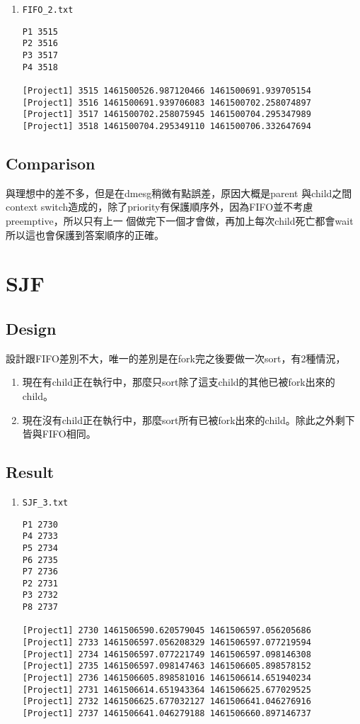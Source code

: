 \documentclass{article}
\begin{document}
\begin{CJK}{UTF8}{bkai}
\begin{enumerate}
\item \texttt{FIFO\_2.txt}
\begin{verbatim}
P1 3515
P2 3516
P3 3517
P4 3518

[Project1] 3515 1461500526.987120466 1461500691.939705154
[Project1] 3516 1461500691.939706083 1461500702.258074897
[Project1] 3517 1461500702.258075945 1461500704.295347989
[Project1] 3518 1461500704.295349110 1461500706.332647694
\end{verbatim}
\end{enumerate}

\subsection{Comparison}
與理想中的差不多，但是在dmesg稍微有點誤差，原因大概是parent 與child之間context
switch造成的，除了priority有保護順序外，因為FIFO並不考慮preemptive，所以只有上一
個做完下一個才會做，再加上每次child死亡都會wait所以這也會保護到答案順序的正確。

\section{SJF}

\subsection{Design}
設計跟FIFO差別不大，唯一的差別是在fork完之後要做一次sort，有2種情況，
\begin{enumerate}
\item 現在有child正在執行中，那麼只sort除了這支child的其他已被fork出來的child。
\item 現在沒有child正在執行中，那麼sort所有已被fork出來的child。除此之外剩下皆與FIFO相同。
\end{enumerate}

\subsection{Result}
\begin{enumerate}
\item \texttt{SJF\_3.txt}
\begin{verbatim}
P1 2730
P4 2733
P5 2734
P6 2735
P7 2736
P2 2731
P3 2732
P8 2737

[Project1] 2730 1461506590.620579045 1461506597.056205686
[Project1] 2733 1461506597.056208329 1461506597.077219594
[Project1] 2734 1461506597.077221749 1461506597.098146308
[Project1] 2735 1461506597.098147463 1461506605.898578152
[Project1] 2736 1461506605.898581016 1461506614.651940234
[Project1] 2731 1461506614.651943364 1461506625.677029525
[Project1] 2732 1461506625.677032127 1461506641.046276916
[Project1] 2737 1461506641.046279188 1461506660.897146737
\end{verbatim}
\end{enumerate}


\end{CJK}
\end{document}
